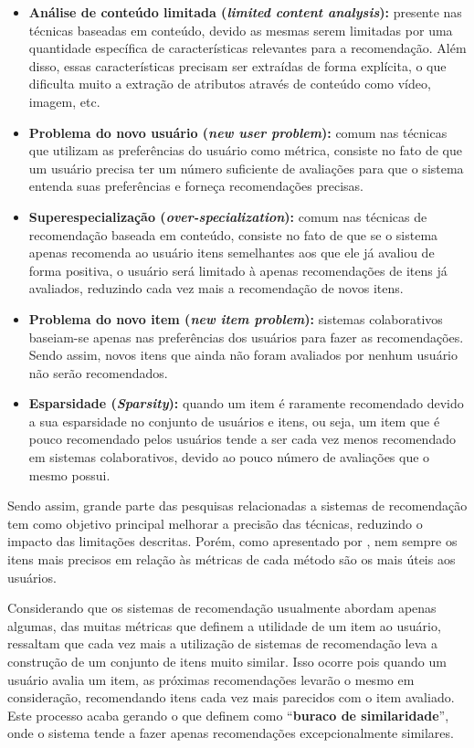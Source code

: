\documentclass[12pt, openright, oneside, a4paper, brazil]{abntex2}
\begin{document}
\begin{itemize}
	\item \textbf{Análise de conteúdo limitada (\textit{limited content analysis}):} presente nas técnicas baseadas em conteúdo, devido as mesmas serem limitadas por uma quantidade específica de características relevantes para a recomendação. Além disso, essas características precisam ser extraídas de forma explícita, o que dificulta muito a extração de atributos através de conteúdo como vídeo, imagem, etc.

	\item \textbf{Problema do novo usuário (\textit{new user problem}):} comum nas técnicas que utilizam as preferências do usuário como métrica, consiste no fato de que um usuário precisa ter um número suficiente de avaliações para que o sistema entenda suas preferências e forneça recomendações precisas.

	\item \textbf{Superespecialização (\textit{over-specialization}):} comum nas técnicas de recomendação baseada em conteúdo, consiste no fato de que se o sistema apenas recomenda ao usuário itens semelhantes aos que ele já avaliou de forma positiva, o usuário será limitado à apenas recomendações de itens já avaliados, reduzindo cada vez mais a recomendação de novos itens.

	\item \textbf{Problema do novo item (\textit{new item problem}):} sistemas colaborativos baseiam-se apenas nas preferências dos usuários para fazer as recomendações. Sendo assim, novos itens que ainda não foram avaliados por nenhum usuário não serão recomendados.

	\item \textbf{Esparsidade (\textit{Sparsity}):} quando um item é raramente recomendado devido a sua esparsidade no conjunto de usuários e itens, ou seja, um item que é pouco recomendado pelos usuários tende a ser cada vez menos recomendado em sistemas colaborativos, devido ao pouco número de avaliações que o mesmo possui.
\end{itemize}

Sendo assim, grande parte das pesquisas relacionadas a sistemas de recomendação tem como objetivo principal melhorar a precisão das técnicas, reduzindo o impacto das limitações descritas. Porém, como apresentado por , nem sempre os itens mais precisos em relação às métricas de cada método são os mais úteis aos usuários.

Considerando que os sistemas de recomendação usualmente abordam apenas algumas, das muitas métricas que definem a utilidade de um item ao usuário,  ressaltam que cada vez mais a utilização de sistemas de recomendação leva a construção de um conjunto de itens muito similar. Isso ocorre pois quando um usuário avalia um item, as próximas recomendações levarão o mesmo em consideração, recomendando itens cada vez mais parecidos com o item avaliado. Este processo acaba gerando o que  definem como “\textbf{buraco de similaridade}”, onde o sistema tende a fazer apenas recomendações excepcionalmente similares.
\end{document}
